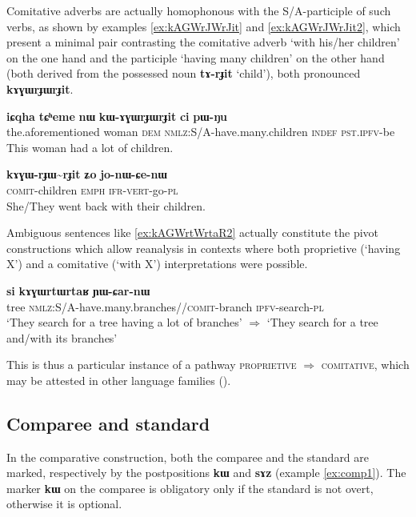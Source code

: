 \documentclass[oldfontcommands,oneside,a4paper,11pt]{article}
\newcommand{\ipa}[1]{\mbox{\phon\textbf{#1}}} %
\newcommand{\tld}{\textasciitilde{}}
\begin{document}
Comitative adverbs are actually homophonous with the S/A-participle of such verbs, as shown by examples \ref{ex:kAGWrJWrJit} and \ref{ex:kAGWrJWrJit2}, which present a minimal pair contrasting the comitative adverb  `with his/her children' on the one hand and the participle  `having many children' on the other hand (both derived from the possessed noun  \ipa{tɤ-rɟit} `child'), both pronounced \ipa{kɤɣɯrɟɯrɟit}.

\begin{exe}
\ex \label{ex:kAGWrJWrJit}
\gll   
\ipa{iɕqha} 	\ipa{tɕʰeme} 	\ipa{nɯ} 	\ipa{kɯ-ɤɣɯrɟɯrɟit} 	\ipa{ci} 	\ipa{pɯ-ŋu}  \\
the.aforementioned woman \textsc{dem} \textsc{nmlz}:S/A-have.many.children \textsc{indef} \textsc{pst.ipfv}-be \\
\glt This woman had a lot of children.
\end{exe}

\begin{exe}
\ex \label{ex:kAGWrJWrJit2}
\gll   
\ipa{kɤɣɯ-rɟɯ\tld{}rɟit} 	\ipa{ʑo} 	\ipa{jo-nɯ-ɕe-nɯ} \\
\textsc{comit}-children \textsc{emph} \textsc{ifr-vert}-go-\textsc{pl} \\
\glt She/They went back with their children.
\end{exe}

Ambiguous sentences like \ref{ex:kAGWrtWrtaR2} actually constitute the pivot constructions which allow reanalysis in contexts where both proprietive (`having X') and a comitative (`with X') interpretations were possible.


  \begin{exe}
\ex \label{ex:kAGWrtWrtaR2}
\gll   
  \ipa{si} 	\ipa{kɤɣɯrtɯrtaʁ} \ipa{ɲɯ-ɕar-nɯ} \\
  tree \textsc{nmlz}:S/A-have.many.branches//\textsc{comit}-branch \textsc{ipfv}-search-\textsc{pl} \\
\glt `They search for a tree having a lot of branches' $\Rightarrow$ `They search for a tree and/with its branches'
\end{exe}

This is thus a particular instance of a pathway \textsc{proprietive} $\Rightarrow$ \textsc{comitative}, which may be attested in other language families (\citealt{stassen00and, stolz06comitative, arkhipov09comitative}).

\subsection{Comparee and standard}
In the comparative construction, both the comparee and the standard are marked, respectively by the postpositions \ipa{kɯ} and \ipa{sɤz}  (example \ref{ex:comp1}). The marker \ipa{kɯ} on the comparee is obligatory only if the standard is not overt, otherwise it is optional.
\end{document}

